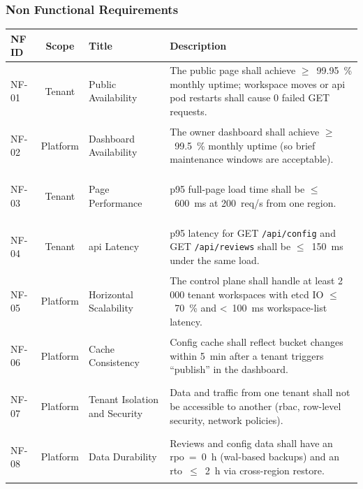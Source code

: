 \documentclass[11pt, a4paper, oneside, listof=totoc]{scrartcl}
\begin{document}
            \subsubsection{Non Functional Requirements}\label{subsubsec:nfr}

                \begin{table}[H]\label{tab:nfr}
                    \centering{}
                    \renewcommand{\arraystretch}{1.5}
                    \begin{tabular}{lcp{4cm}P{8cm}}
                        \toprule
                        NF ID & Scope & Title & Description \\
                        \midrule
                        \hypertarget{nf1}{NF-01} & Tenant & Public Availability & The public page shall achieve $\geq$~99.95~\% monthly uptime; workspace moves or \gls{api} pod restarts shall cause 0 failed GET requests. \\
                        \hypertarget{nf2}{NF-02} & Platform & Dashboard Availability & The owner dashboard shall achieve $\geq$~99.5~\% monthly uptime (so brief maintenance windows are acceptable). \\
                        \hypertarget{nf3}{NF-03} & Tenant & Page Performance & p95 full-page load time shall be $\leq$~600~ms at 200~req/s from one region. \\
                        \hypertarget{nf4}{NF-04} & Tenant & \gls{api} Latency & p95 latency for GET \texttt{/api/config} and GET \texttt{/api/reviews} shall be $\leq$~150~ms under the same load. \\
                        \hypertarget{nf5}{NF-05} & Platform & Horizontal Scalability & The control plane shall handle at least 2 000 tenant workspaces with etcd IO $\leq$~70~\% and <~100~ms workspace-list latency. \\
                        \hypertarget{nf6}{NF-06} & Platform & Cache Consistency & Config cache shall reflect bucket changes within 5~min after a tenant triggers “publish” in the dashboard. \\
                        \hypertarget{nf7}{NF-07} & Platform & Tenant Isolation and Security & Data and traffic from one tenant shall not be accessible to another (\gls{rbac}, row-level security, network policies). \\
                        \hypertarget{nf8}{NF-08} & Platform & Data Durability & Reviews and config data shall have an \gls{rpo}~=~0~h (\gls{wal}-based backups) and an \gls{rto}~$\leq$~2~h via cross-region restore. \\

\end{tabular}
\end{table}
\end{document}
